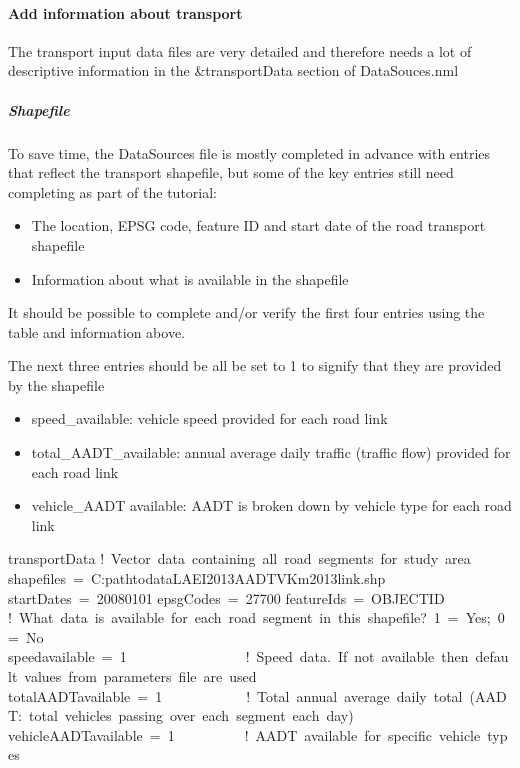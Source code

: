 \documentclass[letterpaper,10pt,english]{sphinxmanual}
\begin{document}
\paragraph{Add information about transport}
\label{\detokenize{Tutorials/GQF:add-information-about-transport}}
The transport input data files are very detailed and therefore needs a
lot of descriptive information in the \&transportData section of
DataSouces.nml


\subparagraph{Shapefile}
\label{\detokenize{Tutorials/GQF:shapefile}}
To save time, the DataSources file is mostly completed in advance with
entries that reflect the transport shapefile, but some of the key
entries still need completing as part of the tutorial:
\begin{itemize}
\item {} 
The location, EPSG code, feature ID and start date of the road
transport shapefile

\item {} 
Information about what is available in the shapefile

\end{itemize}

It should be possible to complete and/or verify the first four entries
using the table and information above.

The next three entries should be all be set to 1 to signify that they
are provided by the shapefile
\begin{itemize}
\item {} 
speed\_available: vehicle speed provided for each road link

\item {} 
total\_AADT\_available: annual average daily traffic (traffic flow)
provided for each road link

\item {} 
vehicle\_AADT available: AADT is broken down by vehicle type for each
road link

\end{itemize}

%
\begin{sphinxVerbatim}[commandchars=\\\{\}]
\PYGZam{}transportData
 ! Vector data containing all road segments for study area
 shapefiles = \PYGZsq{}C:\PYGZbs{}path\PYGZbs{}to\PYGZbs{}data\PYGZbs{}LAEI2013\PYGZus{}AADTVKm\PYGZus{}2013\PYGZus{}link.shp\PYGZsq{}
 startDates = \PYGZsq{}2008\PYGZhy{}01\PYGZhy{}01\PYGZsq{}
 epsgCodes = 27700
 featureIds = \PYGZsq{}OBJECTID\PYGZsq{}
 ! What data is available for each road segment in this shapefile? 1 = Yes; 0 = No
 speed\PYGZus{}available = 1                 ! Speed data. If not available then default values from parameters file are used
 total\PYGZus{}AADT\PYGZus{}available = 1            ! Total annual average daily total (AADT: total vehicles passing over each segment each day)
 vehicle\PYGZus{}AADT\PYGZus{}available = 1          ! AADT available for specific vehicle types
\end{sphinxVerbatim}
\end{document}
